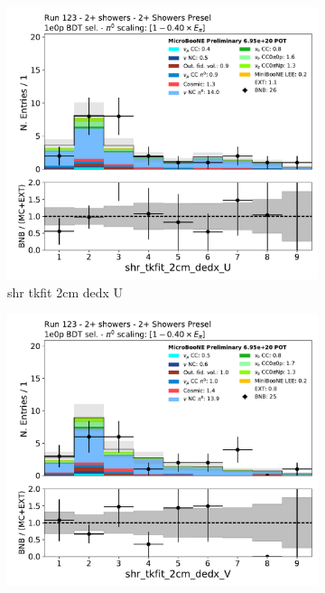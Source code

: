\begin{figure}[H]
    \centering
    \begin{subfigure}{0.3\textwidth}
    \includegraphics[width=1.0\textwidth]{Sidebands/Figures/TwoShr_1e0pSel/BDT/shr_tkfit_2cm_dedx_U.pdf}
    \caption{shr tkfit 2cm dedx U}
    \end{subfigure}
    \begin{subfigure}{0.3\textwidth}
    \includegraphics[width=1.0\textwidth]{Sidebands/Figures/TwoShr_1e0pSel/BDT/shr_tkfit_2cm_dedx_V.pdf}

\end{subfigure}
\end{figure}
